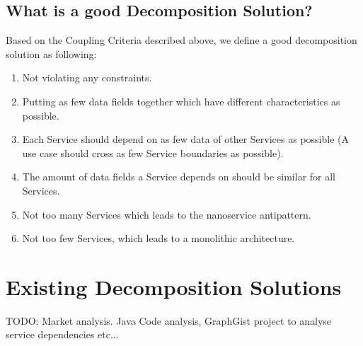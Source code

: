 




\subsection{What is a good Decomposition Solution?}
\label{sec:decompositionRequirements}

Based on the Coupling Criteria described above, we define a good decomposition solution as following:

\begin{enumerate}
	\item Not violating any constraints.
	\item Putting as few data fields together which have different characteristics as possible.
	\item Each Service should depend on as few data of other Services as possible (A use case should cross as few Service boundaries as possible).
	\item The amount of data fields a Service depends on should be similar for all Services.
	\item Not too many Services which leads to the nanoservice antipattern\cite{nanoservice}.
	\item Not too few Services, which leads to a monolithic architecture.
\end{enumerate}

\section{Existing Decomposition Solutions}

TODO: Market analysis. Java Code analysis, GraphGist project to analyse service dependencies etc...






